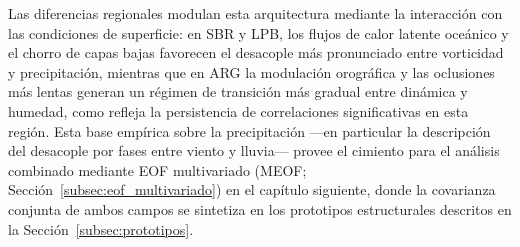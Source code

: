 Las diferencias regionales modulan esta arquitectura mediante la interacción con las condiciones de superficie: en SBR y LPB, los flujos de calor latente oceánico y el chorro de capas bajas favorecen el desacople más pronunciado entre vorticidad y precipitación, mientras que en ARG la modulación orográfica y las oclusiones más lentas generan un régimen de transición más gradual entre dinámica y humedad, como refleja la persistencia de correlaciones significativas en esta región.
Esta base empírica sobre la precipitación —en particular la descripción del desacople por fases entre viento y lluvia— provee el cimiento para el análisis combinado mediante EOF multivariado (MEOF; Sección~\ref{subsec:eof_multivariado}) en el capítulo siguiente, donde la covarianza conjunta de ambos campos se sintetiza en los prototipos estructurales descritos en la Sección~\ref{subsec:prototipos}.